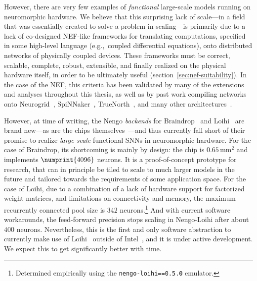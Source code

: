 However, there are very few examples of \emph{functional} large-scale models running on neuromorphic hardware.
We believe that this surprising lack of scale---in a field that was essentially created to solve a problem in scaling---is primarily due to a lack of co-designed NEF-like frameworks for translating computations, specified in some high-level language (e.g.,~coupled differential equations), onto distributed networks of physically coupled devices.
These frameworks must be correct, scalable, complete, robust, extensible, and finally realized on the physical hardware itself, in order to be ultimately useful (section~\ref{sec:nef-suitability}).
In the case of the NEF, this criteria has been validated by many of the extensions and analyses throughout this thesis, as well as by past work compiling networks onto
Neurogrid~\citep{dethier2011brain},
SpiNNaker~\citep{mundy2015, mundy2016real, knight2016},
TrueNorth~\citep{fischl2018},
and many other architectures~\citep{naylor2013managing, bekolay2014, corradi2014, wang2014compact, berzish2016, wang2017neuromorphic, rasmussen2018nengodl, blouw2018a}.

However, at time of writing, the Nengo \emph{backends} for Braindrop~\citep{braindrop2019} and Loihi~\citep{nengoloihi} are brand new---as are the chips themselves~\citep{neckar2018braindrop, davies2018loihi}---and thus currently fall short of their promise to realize \emph{large-scale} functional SNNs in neuromorphic hardware.
For the case of Braindrop, its shortcoming is mainly by design: the chip is $0.65$\,mm${}^2$ and implements $\numprint{4096}$ neurons.
It is a proof-of-concept prototype for research, that can in principle be tiled to scale to much larger models in the future and tailored towards the requirements of some application space.
For the case of Loihi, due to a combination of a lack of hardware support for factorized weight matrices, and limitations on connectivity and memory, the maximum recurrently connected pool size is $342$ neurons.\footnote{%
Determined empirically using the \texttt{nengo-loihi==0.5.0} emulator.}
And with current software workarounds, the feed-forward precision stops scaling in Nengo-Loihi after about $400$ neurons.
Nevertheless, this is the first and only software abstraction to currently make use of Loihi~\citep{blouw2018a} outside of Intel~\citep{lin2018mapping}, and it is under active development.
We expect this to get significantly better with time.

